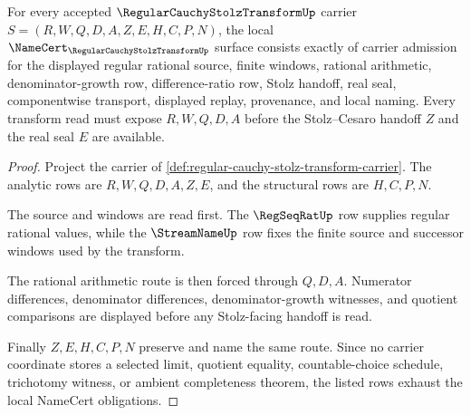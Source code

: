\begin{theorem}
\label{thm:regular-cauchy-stolz-transform-namecert-obligations}
For every accepted $\RegularCauchyStolzTransformUp$ carrier $S=(R,W,Q,D,A,Z,E,H,C,P,N)$, the local $\NameCert_{\RegularCauchyStolzTransformUp}$ surface consists exactly of carrier admission for the displayed regular rational source, finite windows, rational arithmetic, denominator-growth row, difference-ratio row, Stolz handoff, real seal, componentwise transport, displayed replay, provenance, and local naming. Every transform read must expose $R,W,Q,D,A$ before the Stolz--Cesaro handoff $Z$ and the real seal $E$ are available.
\end{theorem}
\begin{proof}
Project the carrier of \autoref{def:regular-cauchy-stolz-transform-carrier}. The analytic rows are $R,W,Q,D,A,Z,E$, and the structural rows are $H,C,P,N$.

The source and windows are read first. The $\RegSeqRatUp$ row supplies regular rational values, while the $\StreamNameUp$ row fixes the finite source and successor windows used by the transform.

The rational arithmetic route is then forced through $Q,D,A$. Numerator differences, denominator differences, denominator-growth witnesses, and quotient comparisons are displayed before any Stolz-facing handoff is read.

Finally $Z,E,H,C,P,N$ preserve and name the same route. Since no carrier coordinate stores a selected limit, quotient equality, countable-choice schedule, trichotomy witness, or ambient completeness theorem, the listed rows exhaust the local NameCert obligations.
\end{proof}

